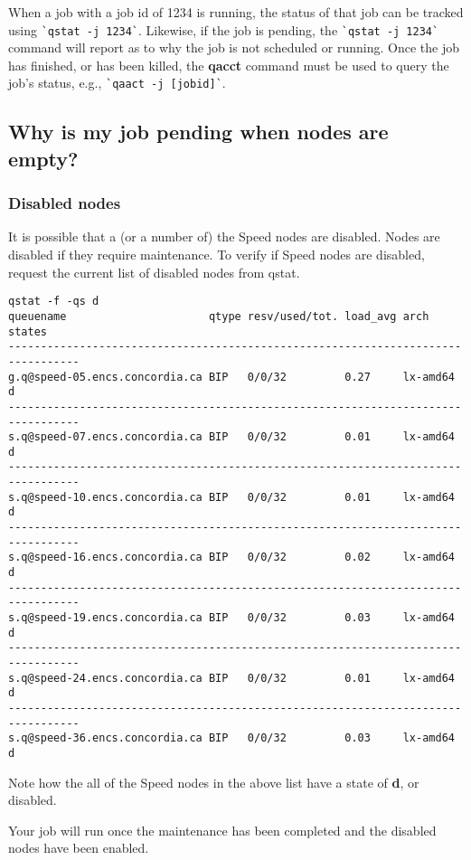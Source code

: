 \documentclass{easychair}
\begin{document}
When a job with a job id of 1234 is running, the status of that job can be tracked using \verb!`qstat -j 1234`!.
Likewise, if the job is pending, the \verb!`qstat -j 1234`! command will report as to why the job is not scheduled or running.
Once the job has finished, or has been killed, the \textbf{qacct} command must be used to query the job's status, e.g., \verb!`qaact -j [jobid]`!. 

\subsection{Why is my job pending when nodes are empty?}
\subsubsection{Disabled nodes}
It is possible that a (or a number of) the Speed nodes are disabled. Nodes are disabled if they require maintenance. 
To verify if Speed nodes are disabled, request the current list of disabled nodes from qstat.

\begin{verbatim}
qstat -f -qs d
queuename                      qtype resv/used/tot. load_avg arch          states
---------------------------------------------------------------------------------
g.q@speed-05.encs.concordia.ca BIP   0/0/32         0.27     lx-amd64      d
---------------------------------------------------------------------------------
s.q@speed-07.encs.concordia.ca BIP   0/0/32         0.01     lx-amd64      d
---------------------------------------------------------------------------------
s.q@speed-10.encs.concordia.ca BIP   0/0/32         0.01     lx-amd64      d
---------------------------------------------------------------------------------
s.q@speed-16.encs.concordia.ca BIP   0/0/32         0.02     lx-amd64      d
---------------------------------------------------------------------------------
s.q@speed-19.encs.concordia.ca BIP   0/0/32         0.03     lx-amd64      d
---------------------------------------------------------------------------------
s.q@speed-24.encs.concordia.ca BIP   0/0/32         0.01     lx-amd64      d
---------------------------------------------------------------------------------
s.q@speed-36.encs.concordia.ca BIP   0/0/32         0.03     lx-amd64      d
\end{verbatim}

Note how the all of the Speed nodes in the above list have a state of \textbf{d}, or disabled.

Your job will run once the maintenance has been completed and the disabled nodes have been enabled.
\end{document}
